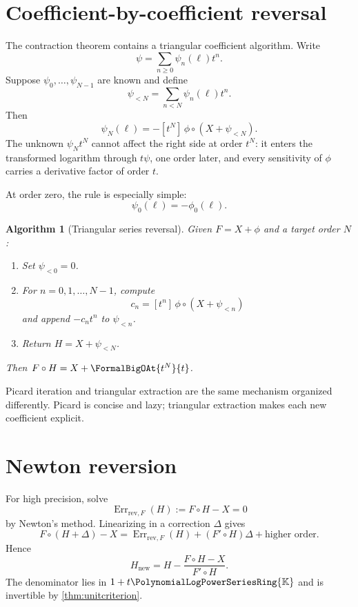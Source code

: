 \documentclass[11pt,oneside,openany]{book}
\newtheorem{algorithm}[theorem]{Algorithm}
\newcommand{\K}{\mathbb{K}}
\newcommand{\Rring}{\PolynomialLogPowerSeriesRing{\K}}
\newcommand{\compose}{\mathbin{\circ}}
\newcommand{\ReversionResidual}[1]{%
  \operatorname{Err}_{\mathrm{rev},F}\!\left(#1\right)%
}
\begin{document}
\section{Coefficient-by-coefficient reversal}
The contraction theorem contains a triangular coefficient algorithm.  Write
\begin{equation}\label{eq:psicoeff}
 \psi=\sum_{n\geq0}\psi_n(\ell)t^n.
\end{equation}
Suppose \(\psi_0,\ldots,\psi_{N-1}\) are known and define
\[
 \psi_{<N}=\sum_{n<N}\psi_n(\ell)t^n.
\]
Then
\begin{equation}\label{eq:reversioncoefficient}
 \psi_N(\ell)
 =-[t^N]\,\phi\compose(X+\psi_{<N}).
\end{equation}
The unknown \(\psi_Nt^N\) cannot affect the right side at order \(t^N\): it
enters the transformed logarithm through \(t\psi\), one order later, and every
sensitivity of \(\phi\) carries a derivative factor of order \(t\).

At order zero, the rule is especially simple:
\begin{equation}\label{eq:psi0}
 \psi_0(\ell)=-\phi_0(\ell).
\end{equation}

\begin{algorithm}[Triangular series reversal]\label{alg:triangularreverse}
Given \(F=X+\phi\) and a target order \(N\):
\begin{enumerate}
\item Set \(\psi_{<0}=0\).
\item For \(n=0,1,\ldots,N-1\), compute
\[
 c_n=[t^n]\,\phi\compose(X+\psi_{<n})
\]
and append \(-c_nt^n\) to \(\psi_{<n}\).
\item Return \(H=X+\psi_{<N}\).
\end{enumerate}
Then \(F\compose H=X+\FormalBigOAt{t^N}{t}\).
\end{algorithm}

Picard iteration and triangular extraction are the same mechanism organized
differently.  Picard is concise and lazy; triangular extraction makes each
new coefficient explicit.

\section{Newton reversion}
For high precision, solve
\[
 \ReversionResidual{H}:=F\compose H-X=0
\]
by Newton's method.  Linearizing in a correction \(\Delta\) gives
\[
 F\compose(H+\Delta)-X
 =\ReversionResidual{H}+(F'\compose H)\Delta+\text{higher order}.
\]
Hence
\begin{equation}\label{eq:newtonreversion}
 H_{\mathrm{new}}
 =H-\frac{F\compose H-X}{F'\compose H}.
\end{equation}
The denominator lies in \(1+t\Rring\) and is invertible by
\cref{thm:unitcriterion}.
\end{document}
